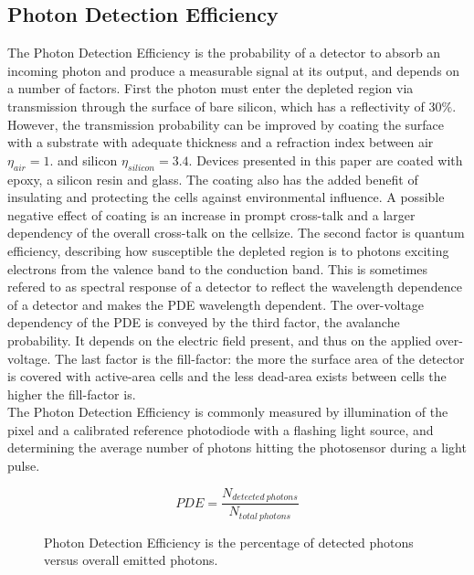 \documentclass[12pt,article,type=msc,colorback,accentcolor=tud9c]{tudthesis}
\begin{document}
\subsection{Photon Detection Efficiency}
The Photon Detection Efficiency is the probability of a detector to absorb an incoming photon and produce a measurable signal at its output, and depends on a number of factors. First the photon must enter the depleted region via transmission through the surface of bare silicon, which has a reflectivity of 30$\%$. However, the transmission probability can be improved by coating the surface with a substrate with adequate thickness and a refraction index between air $\eta_{air} = 1.$ and silicon $\eta_{silicon} = 3.4$. Devices presented in this paper are coated with epoxy, a silicon resin and glass. The coating also has the added benefit of insulating and protecting the cells against environmental influence. A possible negative effect of coating is an increase in prompt cross-talk and a larger dependency of the overall cross-talk on the cellsize. The second factor is quantum efficiency, describing how susceptible the depleted region is to photons exciting electrons from the valence band to the conduction band. This is sometimes refered to as spectral response of a detector to reflect the wavelength dependence of a detector and makes the PDE wavelength dependent. The over-voltage dependency of the PDE is conveyed by the third factor, the avalanche probability. It depends on the electric field present, and thus on the applied over-voltage. The last factor is the fill-factor: the more the surface area of the detector is covered with active-area cells and the less dead-area exists between cells the higher the fill-factor is. \\
The Photon Detection Efficiency is commonly measured by illumination of the pixel and a calibrated reference photodiode with a flashing light source, and determining the average number of photons hitting the photosensor during a light pulse.

\begin{figure}[h]
\begin{equation}
PDE = \frac{N_{detected\:photons}}{N_{total\:photons}}
\end{equation}
\label{PDE_eq}
\caption{Photon Detection Efficiency is the percentage of detected photons versus overall emitted photons. }
\end{figure}


\end{document}
